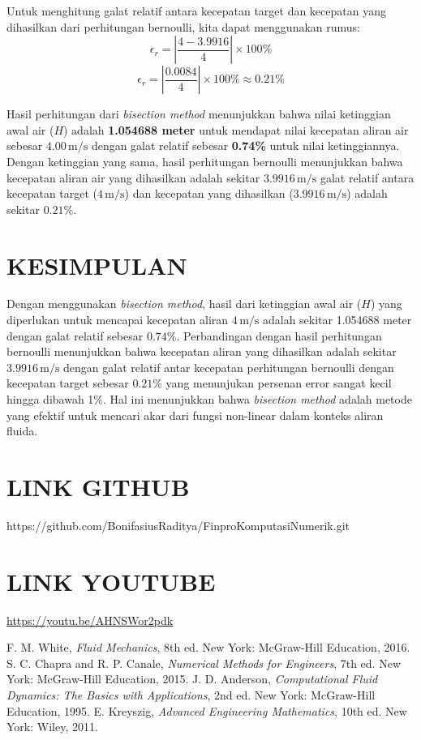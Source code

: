 \documentclass[conference]{IEEEtran}
\begin{document}
Untuk menghitung galat relatif antara kecepatan target dan kecepatan yang dihasilkan dari perhitungan bernoulli, kita dapat menggunakan rumus:
\begin{equation}
\epsilon_r = \left| \frac{4 - 3.9916}{4} \right| \times 100\%
\end{equation}
\begin{equation}
\epsilon_r = \left| \frac{0.0084}{4} \right| \times 100\% \approx 0.21\%
\end{equation}

Hasil perhitungan dari \textit{bisection method} menunjukkan bahwa nilai ketinggian awal air ($H$) adalah \textbf{1.054688 meter} untuk mendapat nilai kecepatan aliran air sebesar $4.00 \, \text{m/s}$ dengan galat relatif sebesar \textbf{0.74\%} untuk nilai ketinggiannya. Dengan ketinggian yang sama, hasil perhitungan bernoulli menunjukkan bahwa kecepatan aliran air yang dihasilkan adalah sekitar $3.9916 \, \text{m/s}$ galat relatif antara kecepatan target ($4 \, \text{m/s}$) dan kecepatan yang dihasilkan ($3.9916 \, \text{m/s}$) adalah sekitar $0.21\%$. \\

\section{KESIMPULAN}
Dengan menggunakan \textit{bisection method}, hasil dari ketinggian awal air ($H$) yang diperlukan untuk mencapai kecepatan aliran $4 \, \text{m/s}$ adalah sekitar 1.054688 meter dengan galat relatif sebesar $0.74\%$. Perbandingan dengan hasil perhitungan bernoulli menunjukkan bahwa kecepatan aliran yang dihasilkan adalah sekitar $3.9916 \, \text{m/s}$ dengan galat relatif antar kecepatan perhitungan bernoulli dengan kecepatan target sebesar $0.21\%$ yang menunjukan persenan error sangat kecil hingga dibawah 1\%. Hal ini menunjukkan bahwa \textit{bisection method} adalah metode yang efektif untuk mencari akar dari fungsi non-linear dalam konteks aliran fluida. \\

\section{LINK GITHUB}
https://github.com/BonifasiusRaditya/FinproKomputasiNumerik.git

\section{LINK YOUTUBE}
\url{https://youtu.be/AHNSWor2pdk} \\

\begin{thebibliography}{00}
 F. M. White, \textit{Fluid Mechanics}, 8th ed. New York: McGraw-Hill Education, 2016.
 S. C. Chapra and R. P. Canale, \textit{Numerical Methods for Engineers}, 7th ed. New York: McGraw-Hill Education, 2015.
 J. D. Anderson, \textit{Computational Fluid Dynamics: The Basics with Applications}, 2nd ed. New York: McGraw-Hill Education, 1995.
 E. Kreyszig, \textit{Advanced Engineering Mathematics}, 10th ed. New York: Wiley, 2011.
\end{thebibliography}
\vspace{12pt}
\end{document}

